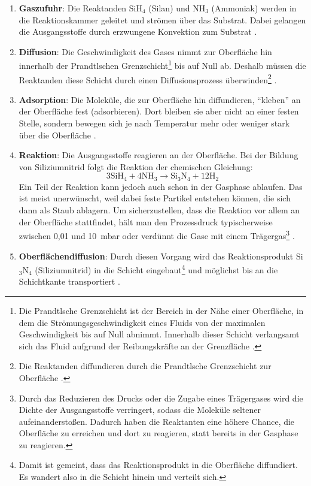 \documentclass{article} %
\begin{document}
\begin{enumerate}
    \item \textbf{Gaszufuhr}: Die Reaktanden SiH$_4$ (Silan) und NH$_3$ (Ammoniak) werden in die Reaktionskammer geleitet und strömen über das Substrat. Dabei 
    gelangen die Ausgangsstoffe durch erzwungene Konvektion zum Substrat \cite{keplinger2024CVD}.
    \item \textbf{Diffusion}: Die Geschwindigkeit des Gases nimmt zur Oberfläche hin innerhalb der Prandtlschen Grenzschicht\footnote{Die Prandtlsche Grenzschicht 
    ist der Bereich in der Nähe einer Oberfläche, in dem die Strömungsgeschwindigkeit eines Fluids von der maximalen Geschwindigkeit bis auf Null abnimmt. 
    Innerhalb dieser Schicht verlangsamt sich das Fluid aufgrund der Reibungskräfte an der Grenzfläche \cite{white2006}.} bis auf Null ab. Deshalb müssen die 
    Reaktanden diese Schicht durch einen Diffusionsprozess überwinden\footnote{Die Reaktanden diffundieren durch die Prandtlsche Grenzschicht zur Oberfläche 
    \cite{bergman2011, incropera2007}.} \cite{keplinger2024CVD}.
    \item \textbf{Adsorption}: Die Moleküle, die zur Oberfläche hin diffundieren, ``kleben'' an der Oberfläche fest (adsorbieren). Dort bleiben sie aber nicht an 
    einer festen Stelle, sondern bewegen sich je nach Temperatur mehr oder weniger stark über die Oberfläche \cite{keplinger2024CVD, bergman2011, incropera2007}.
    \item \textbf{Reaktion}: Die Ausgangsstoffe reagieren an der Oberfläche. Bei der Bildung von Siliziumnitrid folgt die Reaktion der chemischen Gleichung:
    $$
    3\mathrm{SiH}_4 + 4\mathrm{NH}_3 \rightarrow \mathrm{Si}_3\mathrm{N}_4 + 12\mathrm{H}_2
    $$
    Ein Teil der Reaktion kann jedoch auch schon in der Gasphase ablaufen. Das ist meist unerwünscht, weil dabei feste Partikel entstehen können, die sich dann als 
    Staub ablagern. Um sicherzustellen, dass die Reaktion vor allem an der Oberfläche stattfindet, hält man den Prozessdruck typischerweise zwischen 0,01 und 
    10~mbar oder verdünnt die Gase mit einem Trägergas\footnote{Durch das Reduzieren des Drucks oder die Zugabe eines Trägergases wird die Dichte der 
    Ausgangsstoffe verringert, sodass die Moleküle seltener aufeinanderstoßen. Dadurch haben die Reaktanten eine höhere Chance, die Oberfläche zu erreichen und
     dort zu reagieren, statt bereits in der Gasphase zu reagieren.} \cite{keplinger2024CVD}.
    \item \textbf{Oberflächendiﬀusion}: Durch diesen Vorgang wird das Reaktionsprodukt Si$_3$N$_4$ (Siliziumnitrid) in die Schicht eingebaut\footnote{Damit ist gemeint, dass das Reaktionsprodukt in die Oberfläche diffundiert. Es wandert also in die Schicht hinein und verteilt sich.} und möglichst bis an die Schichtkante transportiert \cite{keplinger2024CVD}.

\end{enumerate}
\end{document}
